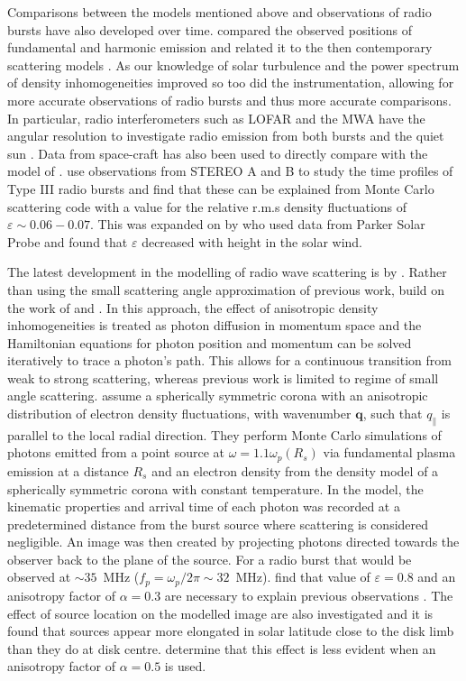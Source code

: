 Comparisons between the models mentioned above and observations of radio bursts have also developed over time. \cite{Stewart1972} compared the observed positions of fundamental and harmonic emission and related it to the then contemporary scattering models \citep[e.g.][]{Fokker1965,Steinberg1971,Riddle1974}. As our knowledge of solar turbulence and the power spectrum of density inhomogeneities improved so too did the instrumentation, allowing for more accurate observations of radio bursts and thus more accurate comparisons. In particular, radio interferometers such as LOFAR and the MWA have the angular resolution to investigate radio emission from both bursts \citep{Zhang2020} and the quiet sun \citep{Sharma2020}. Data from space-craft has also been used to directly compare with the model of \cite{Thejappa2007}. \cite{Krupar2018} use observations from STEREO A and B to study the time profiles of Type III radio bursts and find that these can be explained from Monte Carlo scattering code with a value for the relative r.m.s density fluctuations of $\varepsilon \sim 0.06-0.07$. This was expanded on by \cite{Krupar2020} who used data from Parker Solar Probe and found that $\varepsilon$ decreased with height in the solar wind.

The latest development in the modelling of radio wave scattering is by \cite{Kontar2019}. Rather than using the small scattering angle approximation of previous work, \cite{Kontar2019} build on the work of \cite{Arzner1999} and \cite{Bian2019}. In this approach, the effect of anisotropic density inhomogeneities is treated as photon diffusion in momentum space and the Hamiltonian equations for photon position and momentum can be solved iteratively to trace a photon's path. This allows for a continuous transition from weak to strong scattering, whereas previous work is limited to regime of small angle scattering. \cite{Kontar2019} assume a spherically symmetric corona with an anisotropic distribution of electron density fluctuations, with wavenumber $\mathbf{q}$, such that $q_\parallel$ is parallel to the local radial direction. They perform Monte Carlo simulations of photons emitted from a point source at $\omega = 1.1 \omega_p(R_s)$ via fundamental plasma emission at a distance $R_s$ and an electron density from the \cite{Parker1960} density model of a spherically symmetric corona with constant temperature. In the \cite{Kontar2019} model, the kinematic properties and arrival time of each photon was recorded at a predetermined distance from the burst source where scattering is considered negligible. An image was then created by projecting photons directed towards the observer back to the plane of the source. For a radio burst that would be observed at $\sim 35$~MHz ($f_p = \omega_p/2 \pi \sim 32$~MHz). \cite{Kontar2019} find that value of $\varepsilon = 0.8$ and an anisotropy factor of $\alpha = 0.3$ are necessary to explain previous observations \citep{Kontar2017}. The effect of source location on the modelled image are also investigated and it is found that sources appear more elongated in solar latitude close to the disk limb than they do at disk centre. \cite{Kontar2019} determine that this effect is less evident when an anisotropy factor of $\alpha = 0.5$ is used.

